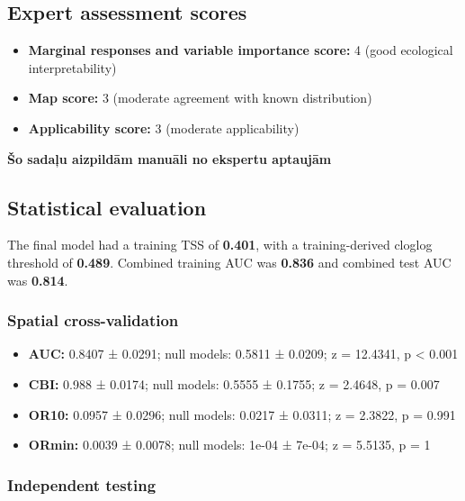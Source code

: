 \documentclass[
  openany]{book}
\providecommand{\tightlist}{%
  \setlength{\itemsep}{0pt}\setlength{\parskip}{0pt}}
\providecommand{\tightlist}{%
  \setlength{\itemsep}{0pt}%
  \setlength{\parskip}{0pt}%
}
\begin{document}
\subsection*{Expert assessment scores}\label{expert-assessment-scores-22}

\begin{itemize}
\tightlist
\item
  \textbf{Marginal responses and variable importance score:} 4 (good ecological interpretability)
\item
  \textbf{Map score:} 3 (moderate agreement with known distribution)
\item
  \textbf{Applicability score:} 3 (moderate applicability)
\end{itemize}

\textbf{Šo sadaļu aizpildām manuāli no ekspertu aptaujām}

\subsection*{Statistical evaluation}\label{statistical-evaluation-22}

The final model had a training TSS of \textbf{0.401}, with a training-derived cloglog threshold of \textbf{0.489}. Combined training AUC was \textbf{0.836} and combined test AUC was \textbf{0.814}.

\subsubsection*{Spatial cross-validation}\label{spatial-cross-validation-22}

\begin{itemize}
\tightlist
\item
  \textbf{AUC:} 0.8407 ± 0.0291; null models: 0.5811 ± 0.0209; z = 12.4341, p \textless{} 0.001
\item
  \textbf{CBI:} 0.988 ± 0.0174; null models: 0.5555 ± 0.1755; z = 2.4648, p = 0.007
\item
  \textbf{OR10:} 0.0957 ± 0.0296; null models: 0.0217 ± 0.0311; z = 2.3822, p = 0.991
\item
  \textbf{ORmin:} 0.0039 ± 0.0078; null models: 1e-04 ± 7e-04; z = 5.5135, p = 1
\end{itemize}

\subsubsection*{Independent testing}\label{independent-testing-22}
\end{document}
